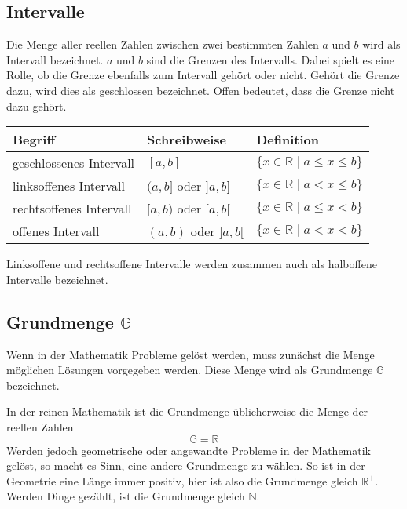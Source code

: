 \subsection{Intervalle}

Die Menge aller reellen Zahlen zwischen zwei bestimmten Zahlen $a$ und $b$ wird als Intervall bezeichnet. $a$ und $b$ sind die Grenzen des Intervalls. Dabei spielt es eine Rolle, ob die Grenze ebenfalls zum Intervall gehört oder nicht. Gehört die Grenze dazu, wird dies als geschlossen bezeichnet. Offen bedeutet, dass die Grenze nicht dazu gehört.

\begin{center}
  \renewcommand{\arraystretch}{1.1}
  \begin{tabularx}{0.9\textwidth}{XXX}
    \textbf{Begriff} & \textbf{Schreibweise} & \textbf{Definition} \\
  \toprule
    geschlossenes Intervall & $[a, b]$ & $\{ x\in\mathbb{R} \;|\; a \leq x \leq b\}$ \\
  \midrule
    linksoffenes Intervall & $(a, b]$ oder $]a, b]$ & $\{ x\in\mathbb{R} \;|\; a< x \leq b\}$ \\
  \midrule
    rechtsoffenes Intervall & $[a, b)$ oder $[a, b[$ & $\{ x\in\mathbb{R} \;|\; a \leq x < b\}$ \\
  \midrule
    offenes Intervall & $(a, b)$ oder $]a, b[$ & $\{ x\in\mathbb{R} \;|\; a< x < b\}$ \\
  \bottomrule
  \end{tabularx}
\end{center}

Linksoffene und rechtsoffene Intervalle werden zusammen auch als halboffene Intervalle bezeichnet.

\subsection{Grundmenge $\mathbb{G}$}

Wenn in der Mathematik Probleme gelöst werden, muss zunächst die Menge möglichen Lösungen vorgegeben werden. Diese Menge wird als Grundmenge $\mathbb{G}$ bezeichnet.

In der reinen Mathematik ist die Grundmenge üblicherweise die Menge der reellen Zahlen
\[
  \mathbb{G} = \mathbb{R}
\]
Werden jedoch geometrische oder angewandte Probleme in der Mathematik gelöst, so macht es Sinn, eine andere Grundmenge zu wählen. So ist in der Geometrie eine Länge immer positiv, hier ist also die Grundmenge gleich $\mathbb{R^{+}}$. Werden Dinge gezählt, ist die Grundmenge gleich $\mathbb{N}$.

